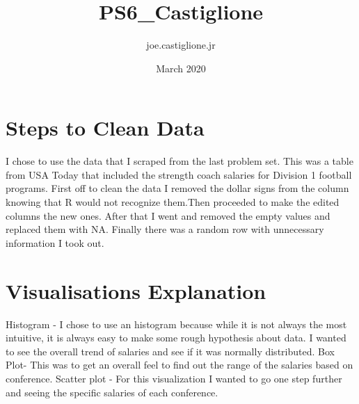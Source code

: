 \documentclass{article}
\title{PS6_Castiglione}
\author{joe.castiglione.jr }
\date{March 2020}
\begin{document}
\maketitle

\section{Steps to Clean Data}
I chose to use the data that I scraped from the last problem set. This was a table from USA Today that included the strength coach salaries for Division 1 football programs. First off to clean the data I removed the dollar signs from the column knowing that R would not recognize them.Then proceeded to make the edited columns the new ones.  After that I went and removed the empty values and replaced them with NA. Finally there was a random row with unnecessary information I took out. 

\section{Visualisations Explanation}
Histogram - I chose to use an histogram because while it is not always the most intuitive, it is always easy to make some rough hypothesis about data. I wanted to see the overall trend of salaries and see if it was normally distributed. Box Plot- This was to get an overall feel to find out the range of the salaries based on conference. Scatter plot - For this visualization I wanted to go one step further and seeing the specific salaries of each conference. 
\end{document}
